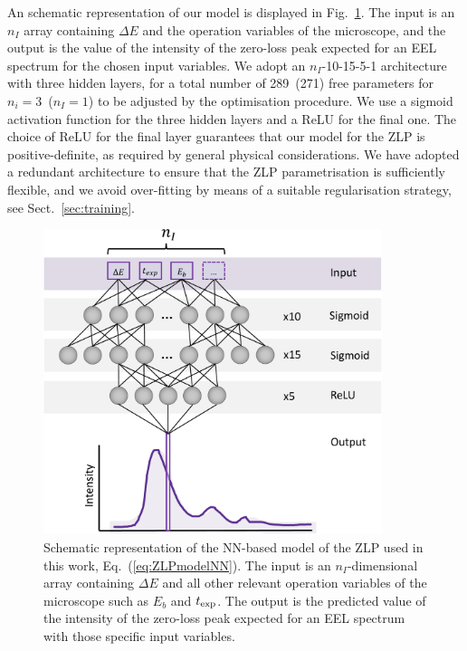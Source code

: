 An schematic representation of our model
is displayed in Fig.~\ref{fig:architecture}.
%
 The input is an $n_I$ array containing $\Delta E$ and the
 operation variables of the microscope, and
 the output is the value of the intensity of the zero-loss peak
 expected for an EEL spectrum for the chosen input variables.
 We adopt an $n_I$-10-15-5-1 architecture with three hidden layers, for a total
 number of 289~(271) free parameters for $n_i=3$~($n_I=1$) to be adjusted by the optimisation procedure.
 We use a sigmoid activation function for the three hidden layers and a ReLU
 for the final one.
 The choice of ReLU for the final layer guarantees that our model for the ZLP
 is positive-definite, as required by general physical considerations.
 We have adopted a redundant architecture  to ensure that the ZLP parametrisation
 is sufficiently flexible, and we avoid over-fitting by means of
 a suitable regularisation strategy, see Sect.~\ref{sec:training}.
  
\begin{figure}[t]
    \centering
    \includegraphics[width=99mm]{plots/architecture.pdf}
    \caption{Schematic representation of the NN-based model of the ZLP used
      in this work, Eq.~(\ref{eq:ZLPmodelNN}).
      The input is an $n_I$-dimensional array containing $\Delta E$ and all other relevant
      operation variables of the microscope such as $E_b$ and $t_{\rm exp}$.
      The output is the predicted value of the intensity of the zero-loss peak
      expected for an EEL spectrum with those specific input variables.
    }
    \label{fig:architecture}
\end{figure}

